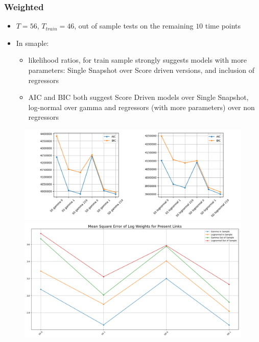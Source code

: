 \documentclass[a4paper,12pt]{article}
\begin{document}
\subsubsection{Weighted}
\begin{itemize}
	\item $T=56$, $T_{train} = 46$, out of sample tests on the remaining $10$ time points
	\item In smaple:
	\begin{itemize}
		\item likelihood ratios, for train sample strongly suggests models with more parameters: Single Snapshot over Score driven versions, and inclusion of regressors 
		\item AIC and BIC both suggest Score Driven models over Single Snapshot, log-normal over gamma and regressors (with more parameters) over non regressors	
	\end{itemize}
\end{itemize}
\begin{figure}[h]
	\includegraphics[width=0.95\linewidth 	]{./figures/AIC_BIC_WTN.png}\\
	\includegraphics[width=0.95\linewidth 	]{./figures/out_of_sample_mse_log_WTN.png}\\
\end{figure}
\end{document}
